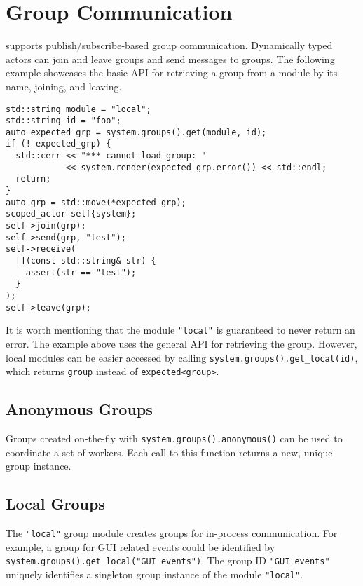 \section{Group Communication}
\label{groups}

\lib supports publish/subscribe-based group communication. Dynamically typed actors can join and leave groups and send messages to groups. The following example showcases the basic API for retrieving a group from a module by its name, joining, and leaving.

\begin{lstlisting}
std::string module = "local";
std::string id = "foo";
auto expected_grp = system.groups().get(module, id);
if (! expected_grp) {
  std::cerr << "*** cannot load group: "
            << system.render(expected_grp.error()) << std::endl;
  return;
}                    
auto grp = std::move(*expected_grp);
scoped_actor self{system};
self->join(grp);
self->send(grp, "test");
self->receive(
  [](const std::string& str) {
    assert(str == "test");
  }
);
self->leave(grp);
\end{lstlisting}

It is worth mentioning that the module \lstinline`"local"` is guaranteed to never return an error. The example above uses the general API for retrieving the group. However, local modules can be easier accessed by calling \lstinline`system.groups().get_local(id)`, which returns \lstinline`group` instead of \lstinline`expected<group>`.

\subsection{Anonymous Groups}
\label{anonymous-group}

Groups created on-the-fly with \lstinline^system.groups().anonymous()^ can be used to coordinate a set of workers.
Each call to this function returns a new, unique group instance.

\subsection{Local Groups}
\label{local-group}

The \lstinline^"local"^ group module creates groups for in-process communication.
For example, a group for GUI related events could be identified by \lstinline^system.groups().get_local("GUI events")^.
The group ID \lstinline^"GUI events"^ uniquely identifies a singleton group instance of the module \lstinline^"local"^.

